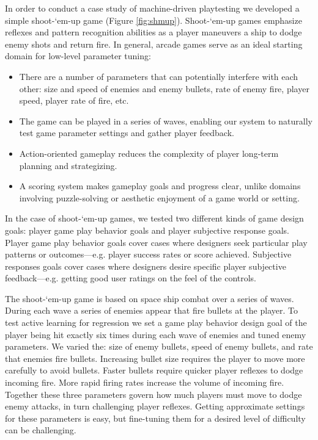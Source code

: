 \documentclass{sig-alternate}
\begin{document}
In order to conduct a case study of machine-driven playtesting we developed a simple shoot-`em-up game (Figure \ref{fig:shmup}).
Shoot-`em-up games emphasize reflexes and pattern recognition abilities as a player maneuvers a ship to dodge enemy shots and return fire.
%
In general, arcade games serve as an ideal starting domain for low-level parameter tuning:
\begin{itemize}
\item There are a number of parameters that can potentially interfere with each other: size and speed of enemies and enemy bullets, rate of enemy fire, player speed, player rate of fire, etc.
\item The game can be played in a series of waves, enabling our system to naturally test game parameter settings and gather player feedback.
\item Action-oriented gameplay reduces the complexity of player long-term planning and strategizing.
\item A scoring system makes gameplay goals and progress clear, unlike domains involving puzzle-solving or aesthetic enjoyment of a game world or setting.
\end{itemize}
%
In the case of shoot-`em-up games, we tested two different kinds of game design goals: player game play behavior goals and player subjective response goals.
Player game play behavior goals cover cases where designers seek particular play patterns or outcomes---e.g. player success rates or score achieved. 
Subjective responses goals cover cases where designers desire specific player subjective feedback---e.g. getting good user ratings on the feel of the controls.


The shoot-`em-up game is based on space ship combat over a series of waves.
During each wave a series of enemies appear that fire bullets at the player. 
To test active learning for regression we set a game play behavior design goal of the player being hit exactly six times during each wave of enemies and tuned enemy parameters.
We varied the: size of enemy bullets, speed of enemy bullets, and rate that enemies fire bullets. 
Increasing bullet size requires the player to move more carefully to avoid bullets. 
Faster bullets require quicker player reflexes to dodge incoming fire. 
More rapid firing rates increase the volume of incoming fire. 
Together these three parameters govern how much players must move to dodge enemy attacks, in turn challenging player reflexes. 
Getting approximate settings for these parameters is easy, but fine-tuning them for a desired level of difficulty can be challenging. 
\end{document}
